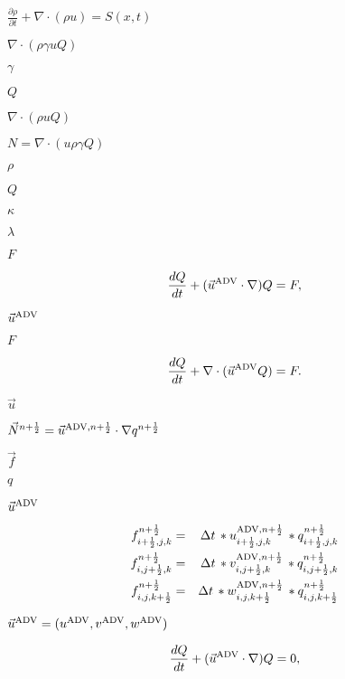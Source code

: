 \documentclass{article}
\begin{document}
$ \frac{\partial \rho}{\partial t} + \nabla \cdot (\rho u) = S(x,t) $
\pagebreak

$ \nabla \cdot (\rho \gamma u Q)$
\pagebreak

$\gamma$
\pagebreak

$Q$
\pagebreak

$ \nabla \cdot (\rho u Q)$
\pagebreak

$N = \nabla \cdot (u \rho \gamma Q)$
\pagebreak

$\rho$
\pagebreak

$ Q $
\pagebreak

$ \kappa $
\pagebreak

$ \lambda $
\pagebreak

$ F $
\pagebreak

\[ \frac{dQ}{dt} + (\vec{u}^{\mbox{\scriptsize ADV}} \cdot \nabla)Q = F, \]
\pagebreak

$\vec{u}^{\mbox{\scriptsize ADV}}$
\pagebreak

$F$
\pagebreak

\[ \frac{dQ}{dt} + \nabla \cdot (\vec{u}^{\mbox{\scriptsize ADV}} Q) = F. \]
\pagebreak

$\vec{u}$
\pagebreak

$ \vec{N}^{n+\frac{1}{2}} = \vec{u}^{\mbox{\scriptsize ADV},n+\frac{1}{2}} \cdot \nabla q^{n+\frac{1}{2}} $
\pagebreak

$ \vec{f} $
\pagebreak

$ q $
\pagebreak

$ \vec{u}^{\mbox{\scriptsize ADV}} $
\pagebreak

\begin{eqnarray*} f_{i+\frac{1}{2},j,k}^{n+\frac{1}{2}} &=& \Delta t \, *u_{i+\frac{1}{2},j,k}^{\mbox{\scriptsize ADV},n+\frac{1}{2}} \, *q_{i+\frac{1}{2},j,k}^{n+\frac{1}{2}} \\ f_{i,j+\frac{1}{2},k}^{n+\frac{1}{2}} &=& \Delta t \, *v_{i,j+\frac{1}{2},k}^{\mbox{\scriptsize ADV},n+\frac{1}{2}} \, *q_{i,j+\frac{1}{2},k}^{n+\frac{1}{2}} \\ f_{i,j,k+\frac{1}{2}}^{n+\frac{1}{2}} &=& \Delta t \, *w_{i,j,k+\frac{1}{2}}^{\mbox{\scriptsize ADV},n+\frac{1}{2}} \, *q_{i,j,k+\frac{1}{2}}^{n+\frac{1}{2}} \end{eqnarray*}
\pagebreak

$ \vec{u}^{\mbox{\scriptsize ADV}} = (u^{\mbox{\scriptsize ADV}},v^{\mbox{\scriptsize ADV}},w^{\mbox{\scriptsize ADV}}) $
\pagebreak

\[ \frac{dQ}{dt} + (\vec{u}^{\mbox{\scriptsize ADV}} \cdot \nabla)Q = 0, \]
\pagebreak
\end{document}
